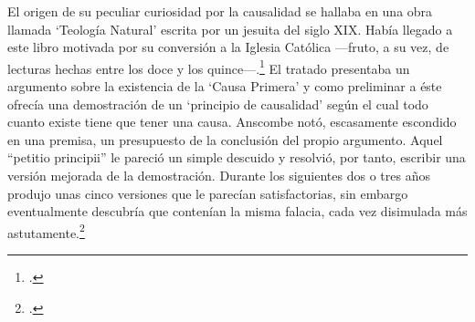         El origen de su peculiar curiosidad por la causalidad se hallaba en una obra
        llamada `Teología Natural' escrita por un jesuita del siglo XIX. Había llegado a
        este libro motivada por su conversión a la Iglesia Católica ---fruto, a su vez,
        de lecturas hechas entre los doce y los quince---.\footcite[cf.~][p.~vii \S1]{M&PotM}
        El tratado presentaba un argumento sobre la existencia de la `Causa Primera' y
        como preliminar a éste ofrecía una demostración de un `principio de causalidad'
        según el cual todo cuanto existe tiene que tener una causa. Anscombe notó,
        escasamente escondido en una premisa, un presupuesto de la conclusión del propio
        argumento. Aquel ``petitio principii'' le pareció un simple descuido y resolvió,
        por tanto, escribir una versión mejorada de la demostración.
        Durante los siguientes dos o tres años produjo unas cinco versiones que le
        parecían satisfactorias, sin embargo eventualmente descubría que contenían la
        misma falacia, cada vez disimulada más astutamente.\footcite[cf.~][p.~vii
        \S2]{M&PotM} 

